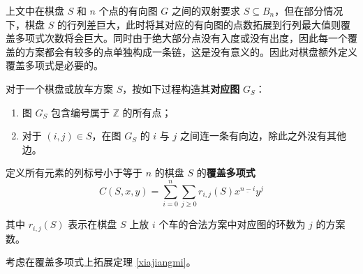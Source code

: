 \documentclass{noithesis}
\begin{document}
	上文中在棋盘 $S$ 和 $n$ 个点的有向图 $G$ 之间的双射要求 $S \subseteq B_n$，但在部分情况下，棋盘 $S$ 的行列差巨大，此时将其对应的有向图的点数拓展到行列最大值则覆盖多项式次数将会巨大。同时由于绝大部分点没有入度或没有出度，因此每一个覆盖的方案都会有较多的点单独构成一条链，这是没有意义的。因此对棋盘额外定义覆盖多项式是必要的。
	\begin{definition}[棋盘与放车方案的对应图]
		对于一个棋盘或放车方案 $S$，按如下过程构造其\textbf{对应图} $G_S$：
		\begin{enumerate}
			\item 图 $G_S$ 包含编号属于 $\mathbb{Z}$ 的所有点；
			\item 对于 $(i,j) \in S$，在图 $G_S$ 的 $i$ 与 $j$ 之间连一条有向边，除此之外没有其他边。
		\end{enumerate}
	\end{definition}
	\begin{definition}[棋盘的覆盖多项式]
		定义所有元素的列标号小于等于 $n$ 的棋盘 $S$ 的\textbf{覆盖多项式}
		\begin{equation}
		C(S,x,y) = \sum_{i=0}^n \sum_{j \geq 0} r_{i,j}(S)x^{\underline{n-i}} y^j
		\end{equation}
		
		其中 $r_{i,j}(S)$ 表示在棋盘 $S$ 上放 $i$ 个车的合法方案中对应图的环数为 $j$ 的方案数。
	\end{definition}
	
	考虑在覆盖多项式上拓展定理 \ref{xiajiangmi}。
	
\end{document}
